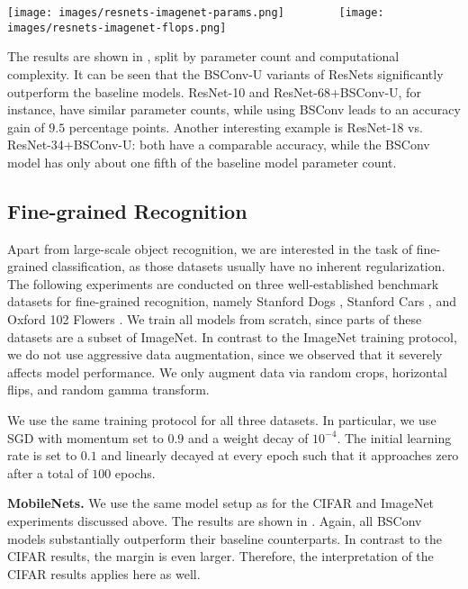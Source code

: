 \documentclass[10pt,twocolumn,letterpaper]{article}
\newcommand{\DCCK}{BSConv\xspace}
\newcommand{\DCCKU}{\DCCK-U\xspace}
\begin{document}
\begin{figure*}
	\center
	\texttt{[image: images/resnets-imagenet-params.png]}~~~~~~~~
	\texttt{[image: images/resnets-imagenet-flops.png]}
	\caption{ResNets on ImageNet.
		For the baseline models, we use ResNet-10/18/26.
		The \DCCK variants are ResNet-10/18/34/68/102.
	}
     \label{fig:resnetsImagenetParamsAndFlops}
\end{figure*}

The results are shown in , split by parameter count and computational complexity.
It can be seen that the \DCCKU variants of ResNets significantly outperform the baseline models.
ResNet-10 and \mbox{ResNet-68+\DCCKU}, for instance, have similar parameter counts, while using \DCCK leads to an accuracy gain of $9.5$ percentage points.
Another interesting example is ResNet-18 vs. \mbox{ResNet-34+\DCCKU}: both have a comparable accuracy, while the \DCCK model has only about one fifth of the baseline model parameter count.

\subsection{Fine-grained Recognition}
Apart from large-scale object recognition, we are interested in the task of fine-grained classification, as those datasets usually have no inherent regularization.
The following experiments are conducted on three well-established benchmark datasets for fine-grained recognition, namely Stanford Dogs \cite{Khosla2011dogs}, Stanford Cars \cite{KrauseStarkDengFei-Fei_3DRR2013}, and Oxford 102 Flowers \cite{nilsback2008automated}.
We train all models from scratch, since parts of these datasets are a subset of ImageNet.
In contrast to the ImageNet training protocol, we do not use aggressive data augmentation, since we observed that it severely affects model performance.
We only augment data via random crops, horizontal flips, and random gamma transform.

We use the same training protocol for all three datasets.
In particular, we use SGD with momentum set to $0.9$ and a weight decay of $10^{-4}$.
The initial learning rate is set to $0.1$ and linearly decayed at every epoch such that it approaches zero after a total of $100$ epochs.

\textbf{MobileNets.}
We use the same model setup as for the \mbox{CIFAR} and ImageNet experiments discussed above.
The results are shown in .
Again, all \DCCK models substantially outperform their baseline counterparts.
In contrast to the CIFAR results, the margin is even larger.
Therefore, the interpretation of the CIFAR results applies here as well.
\end{document}
